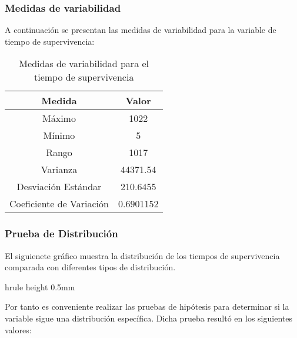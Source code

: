 \documentclass[a4paper,12pt]{article}
\begin{document}
\clearpage

\subsubsection*{Medidas de variabilidad}

A continuación se presentan las medidas de variabilidad para la variable de tiempo de supervivencia:

\begin{table}[h!]
    \centering
    \begin{tabular}{|c|c|}
        \hline
        \textbf{Medida} & \textbf{Valor} \\
        \hline
        Máximo & 1022 \\
        \hline
        Mínimo & 5 \\
        \hline
        Rango & 1017 \\
        \hline
        Varianza & 44371.54 \\
        \hline
        Desviación Estándar & 210.6455 \\
        \hline
        Coeficiente de Variación & 0.6901152 \\
        \hline
    \end{tabular}
    \caption{Medidas de variabilidad para el tiempo de supervivencia}
    \label{tab:medidas_variabilidad}
\end{table}

\subsubsection*{Prueba de Distribución}

El siguienete gráfico muestra la distribución de los tiempos de supervivencia comparada con diferentes tipos de distribución.


hrule height 0.5mm

Por tanto es conveniente realizar las pruebas de hipótesis para determinar si la variable sigue una distribución específica. Dicha prueba resultó en los siguientes valores:
\end{document}

